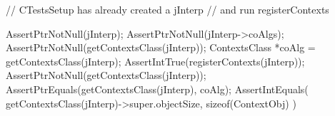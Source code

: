 
\startCTest
  // CTestsSetup has already created a jInterp
  // and run registerContexts
  
  AssertPtrNotNull(jInterp);
  AssertPtrNotNull(jInterp->coAlgs);
  AssertPtrNotNull(getContextsClass(jInterp));
  ContextsClass *coAlg = getContextsClass(jInterp);
  AssertIntTrue(registerContexts(jInterp));
  AssertPtrNotNull(getContextsClass(jInterp));
  AssertPtrEquals(getContextsClass(jInterp), coAlg);
  AssertIntEquals(
    getContextsClass(jInterp)->super.objectSize,
    sizeof(ContextObj)
  )
\stopCTest

\stopTestCase
\stopTestSuite
